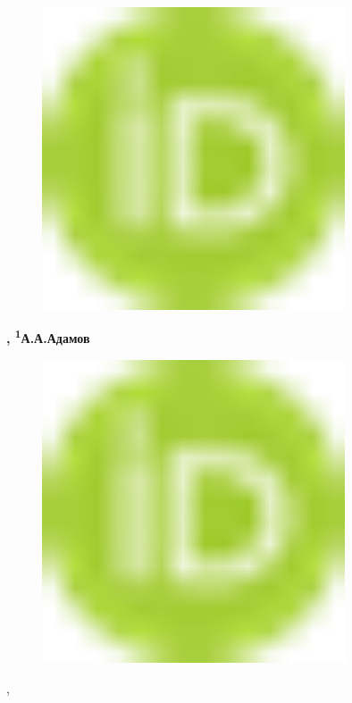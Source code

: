 \begin{figure}[H]
	\centering
	\includegraphics[width=0.8\textwidth]{media/ict/image16}
	\caption*{}
\end{figure}
{\bfseries ,
\textsuperscript{1}А.А.Адамов}
\begin{figure}[H]
	\centering
	\includegraphics[width=0.8\textwidth]{media/ict/image16}
	\caption*{}
\end{figure}
,

